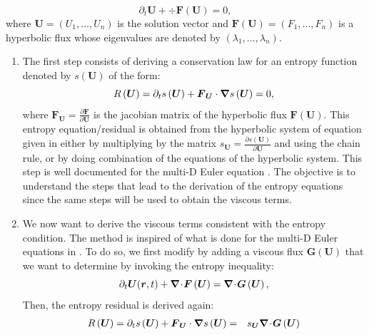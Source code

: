 %
\begin{equation}\label{eq:hyp_syst_sct1b}
\partial_t \boldsymbol{U} + \div \boldsymbol{F} \left( \boldsymbol{U} \right) = 0,
\end{equation}
%
where $\boldsymbol{U} = \left( U_1, \dots, U_n \right)$ is the solution vector and $\boldsymbol{F} \left( \boldsymbol{U} \right) = \left( F_1, \dots, F_n \right)$ is a hyperbolic flux whose eigenvalues are denoted by $\left( \lambda_1, \dots, \lambda_n \right)$.
\begin{enumerate}
\item The first step consists of deriving a conservation law for an entropy function denoted by $s\left(\boldsymbol{U}\right)$ of the form: 
%
\begin{equation}
R\left(\boldsymbol{U}\right) = \partial_t s\left(\boldsymbol{U}\right) + \boldsymbol{F}_{\boldsymbol{U}} \cdot \boldsymbol{\nabla} s \left(\boldsymbol{U}\right) = 0,
\end{equation}
%
where $\boldsymbol{F}_{\boldsymbol{U}} = \frac{\partial \boldsymbol{F}}{\partial \boldsymbol{U}}$ is the jacobian matrix of the hyperbolic flux $\boldsymbol{F} \left( \boldsymbol{U} \right)$.
This entropy equation/residual is obtained from the hyperbolic system of equation given in  either by multiplying by the matrix $s_{\boldsymbol{U}} = \frac{\partial s (\boldsymbol{U})}{\partial \boldsymbol{U}}$ and using the chain rule, or by doing combination of the equations of the hyperbolic system. This step is well documented for the multi-D Euler equation \cite{Toro}. The objective is to understand the steps that lead to the derivation of the entropy equations since the same steps will be used to obtain the viscous terms.
\item We now want to derive the viscous terms consistent with the entropy condition. The method is inspired of what is done for the multi-D Euler equations in \cite{jlg}. To do so, we first modify  by adding a viscous flux $\boldsymbol{G} \left( \boldsymbol{U} \right)$ that we want to determine by invoking the entropy inequality:
%
\begin{equation}\label{eq:hyp_syst2_sct1b}
\partial_t \boldsymbol{U}(\boldsymbol r,t) + \boldsymbol{\nabla}\! \cdot \! \boldsymbol{F} \left( \boldsymbol{U} \right) = \boldsymbol{\nabla}\! \cdot \! \boldsymbol{G} \left( \boldsymbol{U} \right),
\end{equation}
%
Then, the entropy residual is derived again:
%
\begin{eqnarray}\label{eq:hyp_syst3_sct1b}
R\left(\boldsymbol{U}\right) = \partial_t s\left(\boldsymbol{U}\right) + \boldsymbol{F}_{\boldsymbol{U}} \cdot \grad s \left(\boldsymbol{U}\right) &=& s_{\boldsymbol{U}} \div \boldsymbol{G} \left( \boldsymbol{U} \right) \nonumber \\

\end{eqnarray}
\end{enumerate}
